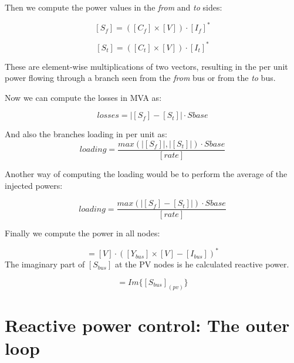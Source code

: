 \documentclass[nols,a4paper,twoside,symmetric,notoc,fleqn]{tufte-book}
\begin{document}
Then we compute the power values in the \textit{from} and \textit{to} sides:

\begin{equation}
{[S_f] = ([C_f] \times [V]) \cdot [I_f]^*}
\end{equation}

\begin{equation}
{[S_t] = ([C_t] \times [V]) \cdot [I_t]^*}
\end{equation}

These are element-wise multiplications of two vectors, resulting in the per unit power flowing through a branch seen from the \textit{from} bus or from the \textit{to} bus.

Now we can compute the losses in MVA as:

\begin{equation}
{{losses} = |[S_f] - [S_t]| \cdot Sbase}
\end{equation}

And also the branches loading in per unit as:
\begin{equation}
{{loading} = \frac{max(|[S_f]|, |[S_t]|) \cdot Sbase}{ [rate]}}
\end{equation}

Another way of computing the loading would be to perform the average of the injected powers:

\begin{equation}
{{loading} = \frac{max(|[S_f] - [S_t]|) \cdot Sbase}{ [rate]}}
\end{equation}



Finally we compute the power in all nodes:

\begin{equation}
[S_{bus}] = [V] \cdot \left([Y_{bus}] \times [V] - [I_{bus}] \right)^*
\end{equation}
The imaginary part of $[S_{bus}]$ at the PV nodes is he calculated reactive power.


\begin{equation}
[Q_{pv}] = Im \{[S_{bus}]_{(pv)} \}
\end{equation}



\newpage
\section{Reactive power control: The outer loop}
\end{document}
